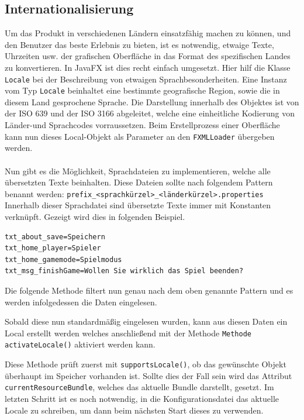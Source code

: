 \subsection{Internationalisierung}\label{sssec:internationalization}
Um das Produkt in verschiedenen Ländern einsatzfähig machen zu können, und den Benutzer das beste Erlebnis zu bieten, ist es notwendig, etwaige Texte, Uhrzeiten usw. der grafischen Oberfläche in das Format des spezifischen Landes zu konvertieren.
In JavaFX ist dies recht einfach umgesetzt.
Hier hilf die Klasse \lstinline[style=java]{Locale} bei der Beschreibung von etwaigen Sprachbesonderheiten.
Eine Instanz vom Typ \lstinline[style=java]{Locale} beinhaltet eine bestimmte geografische Region, sowie die in diesem Land gesprochene Sprache.
Die Darstellung innerhalb des Objektes ist von der ISO 639 und der ISO 3166 abgeleitet, welche eine einheitliche Kodierung von Länder-und Sprachcodes vorraussetzen.
Beim Erstellprozess einer Oberfläche kann nun dieses Local-Objekt als Parameter an den \lstinline[style=java]{FXMLLoader} übergeben werden.\\\\
Nun gibt es die Möglichkeit, Sprachdateien zu implementieren, welche alle übersetzten Texte beinhalten.
Diese Dateien sollte nach folgendem Pattern benannt werden: \lstinline[style=java]{prefix_<sprachkürzel>_<länderkürzel>.properties}\\
Innerhalb dieser Sprachdatei sind übersetzte Texte immer mit Konstanten verknüpft.
Gezeigt wird dies in folgenden Beispiel.
\begin{lstlisting}[style=java,caption=Beispielbundle,label=resource]
txt_about_save=Speichern
txt_home_player=Spieler
txt_home_gamemode=Spielmodus
txt_msg_finishGame=Wollen Sie wirklich das Spiel beenden?
\end{lstlisting}
Die folgende Methode filtert nun genau nach dem oben genannte Pattern und es werden infolgedessen die Daten eingelesen.

Sobald diese nun standardmäßig eingelesen wurden, kann aus diesen Daten ein Local erstellt werden welches anschließend mit der Methode \lstinline[style=java]{Methode activateLocale()} aktiviert werden kann.

Diese Methode prüft zuerst mit \lstinline[style=java]{supportsLocale()}, ob das gewünschte Objekt überhaupt im Speicher vorhanden ist.
Sollte dies der Fall sein wird das Attribut \lstinline[style=java]{currentResourceBundle}, welches das aktuelle Bundle darstellt, gesetzt.
Im letzten Schritt ist es noch notwendig, in die Konfigurationsdatei das aktuelle Locale zu schreiben, um dann beim nächsten Start dieses zu verwenden.
